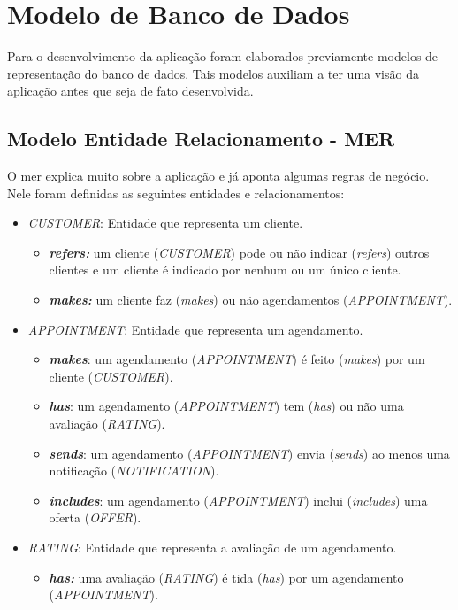 \section{Modelo de Banco de Dados}
Para o desenvolvimento da aplicação foram elaborados previamente modelos de representação do banco de dados. Tais modelos auxiliam a ter uma visão da aplicação antes que seja de fato desenvolvida.
\subsection{Modelo Entidade Relacionamento - MER}
O \gls{mer} explica muito sobre a aplicação e já aponta algumas regras de negócio.
Nele foram definidas as seguintes entidades e relacionamentos:
\begin{itemize}
	\item \emph{CUSTOMER}: Entidade que representa um cliente.
	\begin{itemize}
		\item \textbf{\textit{refers:}} um cliente (\emph{CUSTOMER}) pode ou não indicar (\textit{refers}) outros clientes e um cliente é indicado por nenhum ou um único cliente.
		\item \textbf{\textit{makes:}} um cliente faz (\emph{makes}) ou não agendamentos (\emph{APPOINTMENT}).
	\end{itemize}
	\item \emph{APPOINTMENT}: Entidade que representa um agendamento.
	\begin{itemize}
		\item \textbf{\textit{makes}}: um agendamento (\emph{APPOINTMENT}) é feito (\textit{makes}) por um cliente (\emph{CUSTOMER}). 
		\item \textbf{\textit{has}}: um agendamento (\emph{APPOINTMENT}) tem (\textit{has}) ou não uma avaliação (\emph{RATING}).
		\item \textbf{\textit{sends}}: um agendamento (\emph{APPOINTMENT}) envia (\textit{sends}) ao menos uma notificação (\emph{NOTIFICATION}).
		\item \textbf{\textit{includes}}: um agendamento (\emph{APPOINTMENT}) inclui (\textit{includes}) uma oferta (\emph{OFFER}).
	\end{itemize}
	\item \emph{RATING}: Entidade que representa a avaliação de um agendamento.
	\begin{itemize}
		\item \textbf{\textit{has:}} uma avaliação (\emph{RATING}) é tida (\textit{has}) por um agendamento (\emph{APPOINTMENT}).

\end{itemize}
\end{itemize}
